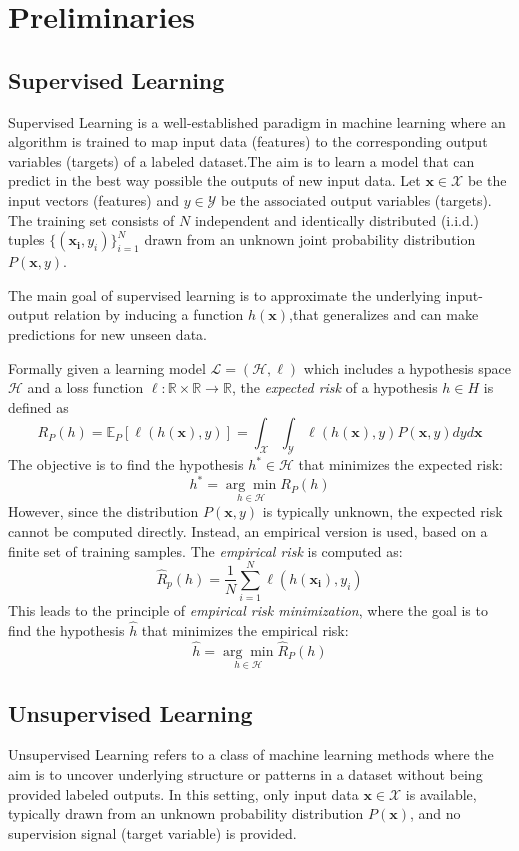 \chapter{Preliminaries}\label{ch:preliminaries}

\section{Supervised Learning}\label{sec:supervised_leaning}
Supervised Learning is a well-established paradigm in machine learning where an
algorithm is trained to map input data (features) to the corresponding output
variables (targets) of a labeled dataset.The aim is to learn a model that can
predict in the best way possible the outputs of new input data. Let $\mathbf{x}
    \in \mathcal{X}$ be the input vectors (features) and $ y \in \mathcal{Y}$ be
the associated output variables (targets). The training set consists of $N$
independent and identically distributed (i.i.d.) tuples $\{(\mathbf{x_i},
    y_i)\}^N_{i=1}$ drawn from an unknown joint probability distribution
$P(\mathbf{x},y)$.

The main goal of supervised learning is to approximate the underlying
input-output relation by inducing a function $h(\mathbf{x})$,that generalizes
and can make predictions for new unseen data.

Formally given a learning model $\mathcal{L} = (\mathcal{H},\ell)$ which
includes a hypothesis space $\mathcal{H}$ and a loss function $\ell: \mathbb{R}
    \times \mathbb{R} \rightarrow \mathbb{R}$, the \textit{expected risk} of a
hypothesis $h \in H$ is defined as
\[ 
    R_P(h) = \mathbb{E}_P[\ell(h(\mathbf{x}),y)] = \int_{\mathcal{X}} \int_{\mathcal{Y}}
    \ell(h(\mathbf{x}),y)P(\mathbf{x},y)dyd\mathbf{x}
\]
The objective is to find the hypothesis $h^* \in \mathcal{H}$ that minimizes
the expected risk:
\[ 
    h^* = \underset{h \in \mathcal{H}}{\arg\min} R_P(h)
\]
However, since the distribution $P(\mathbf{x},y)$ is typically unknown, the
expected risk cannot be computed directly. Instead, an empirical version is
used, based on a finite set of training samples. The \textit{empirical risk} is
computed as:
\[
    \hat{R}_p(h) = {\frac{1}{N}} \sum^N_{i=1} \ell(h(\mathbf{x_i}),y_i)
\]
This leads to the principle of \textit{empirical risk minimization}, where the
goal is to find the hypothesis $\hat{h}$ that minimizes the empirical risk:
\[
    \hat{h} = \underset{h \in \mathcal{H}}{\arg\min} \hat{R}_P(h)
\]

\section{Unsupervised Learning}\label{sec:unsupervised_learning}
Unsupervised Learning refers to a class of machine learning methods where the
aim is to uncover underlying structure or patterns in a dataset without being
provided labeled outputs. In this setting, only input data $\mathbf{x} \in
    \mathcal{X}$ is available, typically drawn from an unknown probability
distribution $P(\mathbf{x})$, and no supervision signal (target variable) is
provided.

